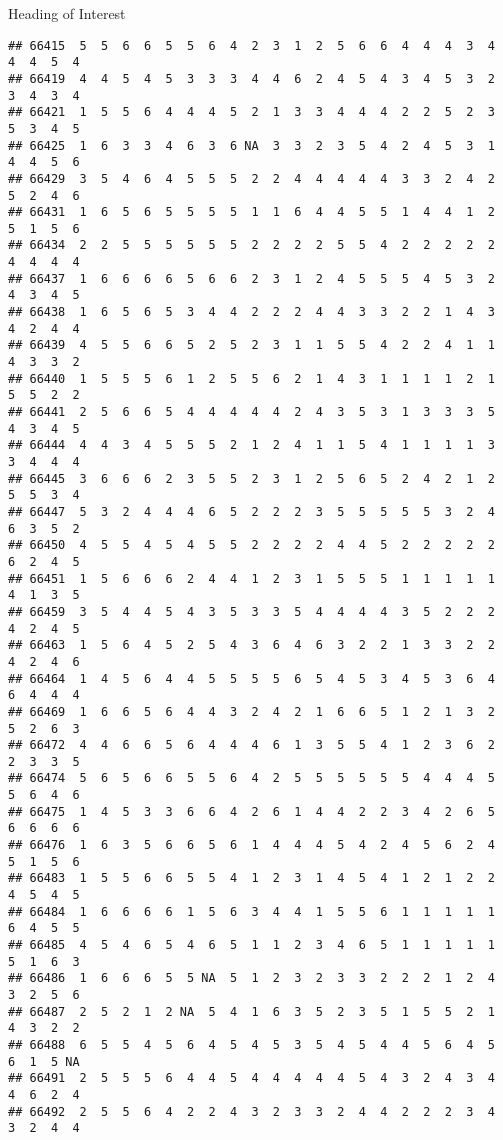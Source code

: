 \documentclass[
  ignorenonframetext,
]{beamer}
\begin{document}
\begin{frame}[fragile]{Heading of Interest}
\begin{verbatim}
## 66415  5  5  6  6  5  5  6  4  2  3  1  2  5  6  6  4  4  4  3  4  4  4  5  4
## 66419  4  4  5  4  5  3  3  3  4  4  6  2  4  5  4  3  4  5  3  2  3  4  3  4
## 66421  1  5  5  6  4  4  4  5  2  1  3  3  4  4  4  2  2  5  2  3  5  3  4  5
## 66425  1  6  3  3  4  6  3  6 NA  3  3  2  3  5  4  2  4  5  3  1  4  4  5  6
## 66429  3  5  4  6  4  5  5  5  2  2  4  4  4  4  4  3  3  2  4  2  5  2  4  6
## 66431  1  6  5  6  5  5  5  5  1  1  6  4  4  5  5  1  4  4  1  2  5  1  5  6
## 66434  2  2  5  5  5  5  5  5  2  2  2  2  5  5  4  2  2  2  2  2  4  4  4  4
## 66437  1  6  6  6  6  5  6  6  2  3  1  2  4  5  5  5  4  5  3  2  4  3  4  5
## 66438  1  6  5  6  5  3  4  4  2  2  2  4  4  3  3  2  2  1  4  3  4  2  4  4
## 66439  4  5  5  6  6  5  2  5  2  3  1  1  5  5  4  2  2  4  1  1  4  3  3  2
## 66440  1  5  5  5  6  1  2  5  5  6  2  1  4  3  1  1  1  1  2  1  5  5  2  2
## 66441  2  5  6  6  5  4  4  4  4  4  2  4  3  5  3  1  3  3  3  5  4  3  4  5
## 66444  4  4  3  4  5  5  5  2  1  2  4  1  1  5  4  1  1  1  1  3  3  4  4  4
## 66445  3  6  6  6  2  3  5  5  2  3  1  2  5  6  5  2  4  2  1  2  5  5  3  4
## 66447  5  3  2  4  4  4  6  5  2  2  2  3  5  5  5  5  5  3  2  4  6  3  5  2
## 66450  4  5  5  4  5  4  5  5  2  2  2  2  4  4  5  2  2  2  2  2  6  2  4  5
## 66451  1  5  6  6  6  2  4  4  1  2  3  1  5  5  5  1  1  1  1  1  4  1  3  5
## 66459  3  5  4  4  5  4  3  5  3  3  5  4  4  4  4  3  5  2  2  2  4  2  4  5
## 66463  1  5  6  4  5  2  5  4  3  6  4  6  3  2  2  1  3  3  2  2  4  2  4  6
## 66464  1  4  5  6  4  4  5  5  5  5  6  5  4  5  3  4  5  3  6  4  6  4  4  4
## 66469  1  6  6  5  6  4  4  3  2  4  2  1  6  6  5  1  2  1  3  2  5  2  6  3
## 66472  4  4  6  6  5  6  4  4  4  6  1  3  5  5  4  1  2  3  6  2  2  3  3  5
## 66474  5  6  5  6  6  5  5  6  4  2  5  5  5  5  5  5  4  4  4  5  5  6  4  6
## 66475  1  4  5  3  3  6  6  4  2  6  1  4  4  2  2  3  4  2  6  5  6  6  6  6
## 66476  1  6  3  5  6  6  5  6  1  4  4  4  5  4  2  4  5  6  2  4  5  1  5  6
## 66483  1  5  5  6  6  5  5  4  1  2  3  1  4  5  4  1  2  1  2  2  4  5  4  5
## 66484  1  6  6  6  6  1  5  6  3  4  4  1  5  5  6  1  1  1  1  1  6  4  5  5
## 66485  4  5  4  6  5  4  6  5  1  1  2  3  4  6  5  1  1  1  1  1  5  1  6  3
## 66486  1  6  6  6  5  5 NA  5  1  2  3  2  3  3  2  2  2  1  2  4  3  2  5  6
## 66487  2  5  2  1  2 NA  5  4  1  6  3  5  2  3  5  1  5  5  2  1  4  3  2  2
## 66488  6  5  5  4  5  6  4  5  4  5  3  5  4  5  4  4  5  6  4  5  6  1  5 NA
## 66491  2  5  5  5  6  4  4  5  4  4  4  4  4  5  4  3  2  4  3  4  4  6  2  4
## 66492  2  5  5  6  4  2  2  4  3  2  3  3  2  4  4  2  2  2  3  4  3  2  4  4

\end{verbatim}
\end{frame}
\end{document}
